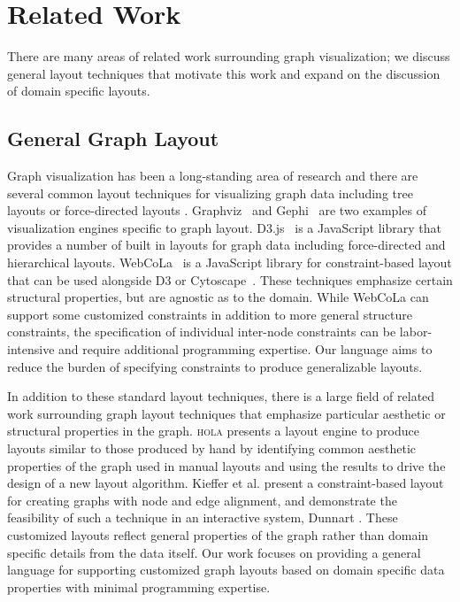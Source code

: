 \section{Related Work}
There are many areas of related work surrounding graph visualization; we
discuss general layout techniques that motivate this work and expand on the
discussion of domain specific layouts.

\subsection{General Graph Layout}
Graph visualization has been a long-standing area of research and there are
several common layout techniques for visualizing graph data including tree
layouts or force-directed layouts
\cite{herman2000graph,eades2010graph}. Graphviz~\cite{ellson2001graphviz}
and Gephi~\cite{bastian2009gephi} are two examples of visualization engines
specific to graph layout. D3.js~\cite{bostock:d3} is a JavaScript library
that provides a number of built in layouts for graph data including
force-directed and hierarchical layouts. WebCoLa~\cite{WebCoLa} is a
JavaScript library for constraint-based layout that can be used alongside
D3 or Cytoscape~\cite{shannon2003cytoscape}. These techniques emphasize
certain structural properties, but are agnostic as to the domain. While
WebCoLa can support some customized constraints in addition to more general
structure constraints, the specification of individual inter-node
constraints can be labor-intensive and require additional programming
expertise. Our language aims to reduce the burden of specifying constraints
to produce generalizable layouts.

In addition to these standard layout techniques, there is a large field of
related work surrounding graph layout techniques that emphasize particular
aesthetic or structural properties in the graph. \textsc{hola}
\cite{kieffer2016hola} presents a layout engine to produce layouts similar
to those produced by hand by identifying common aesthetic properties of the
graph used in manual layouts and using the results to drive the design of a
new layout algorithm. Kieffer et al. \cite{kieffer2013incremental} present
a constraint-based layout for creating graphs with node and edge alignment,
and demonstrate the feasibility of such a technique in an interactive
system, Dunnart \cite{dwyer2008dunnart}. These customized layouts reflect
general properties of the graph rather than domain specific details from
the data itself. Our work focuses on providing a general language for
supporting customized graph layouts based on domain specific data
properties with minimal programming expertise.

